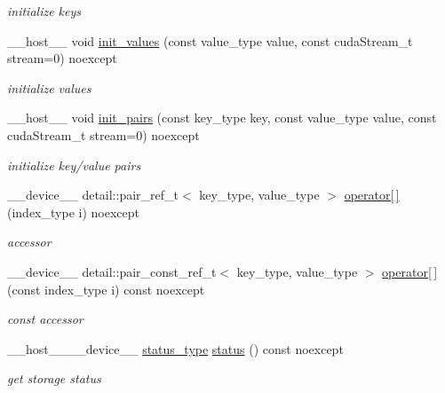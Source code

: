 \begin{DoxyCompactItemize}
\begin{DoxyCompactList}\small\item\em initialize keys \end{DoxyCompactList}\item 
\+\_\+\+\_\+host\+\_\+\+\_\+ void \hyperlink{classwarpcore_1_1storage_1_1key__value_1_1SoAStore_a59dff9eee0d6a58160c4f9a4350e5f9c}{init\+\_\+values} (const value\+\_\+type value, const cuda\+Stream\+\_\+t stream=0) noexcept
\begin{DoxyCompactList}\small\item\em initialize values \end{DoxyCompactList}\item 
\+\_\+\+\_\+host\+\_\+\+\_\+ void \hyperlink{classwarpcore_1_1storage_1_1key__value_1_1SoAStore_a564d505e541f36b9b9088fc25f625c52}{init\+\_\+pairs} (const key\+\_\+type key, const value\+\_\+type value, const cuda\+Stream\+\_\+t stream=0) noexcept
\begin{DoxyCompactList}\small\item\em initialize key/value pairs \end{DoxyCompactList}\item 
\+\_\+\+\_\+device\+\_\+\+\_\+ detail\+::pair\+\_\+ref\+\_\+t$<$ key\+\_\+type, value\+\_\+type $>$ \hyperlink{classwarpcore_1_1storage_1_1key__value_1_1SoAStore_a0ffce52b3ad4d09f6709f3731c79fb3e}{operator\mbox{[}$\,$\mbox{]}} (index\+\_\+type i) noexcept
\begin{DoxyCompactList}\small\item\em accessor \end{DoxyCompactList}\item 
\+\_\+\+\_\+device\+\_\+\+\_\+ detail\+::pair\+\_\+const\+\_\+ref\+\_\+t$<$ key\+\_\+type, value\+\_\+type $>$ \hyperlink{classwarpcore_1_1storage_1_1key__value_1_1SoAStore_a8167ef32ca834fb530cf787a83a493d3}{operator\mbox{[}$\,$\mbox{]}} (const index\+\_\+type i) const noexcept
\begin{DoxyCompactList}\small\item\em const accessor \end{DoxyCompactList}\item 
\+\_\+\+\_\+host\+\_\+\+\_\+\+\_\+\+\_\+device\+\_\+\+\_\+ \hyperlink{classwarpcore_1_1Status}{status\+\_\+type} \hyperlink{classwarpcore_1_1storage_1_1key__value_1_1SoAStore_afe3a33107f19d895ed0aa78bfedd2de0}{status} () const noexcept
\begin{DoxyCompactList}\small\item\em get storage status \end{DoxyCompactList}\item 

\end{DoxyCompactItemize}
